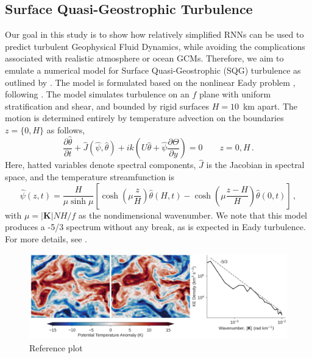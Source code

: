 \subsection{Surface Quasi-Geostrophic Turbulence}
\label{subsec:sqg}

Our goal in this study is to show how relatively simplified RNNs can be used to
predict turbulent Geophysical Fluid Dynamics, while avoiding the complications
associated with realistic atmosphere or ocean GCMs.
Therefore, we aim to emulate a numerical model for Surface Quasi-Geostrophic
(SQG) turbulence as outlined by \citet{tulloch_note_2009}.
The model is formulated based on the nonlinear Eady problem
\citep{eady_long_1949}, following \citet{blumen_uniform_1978-1}.
The model simulates turbulence
on an $f$ plane with uniform stratification and shear, and bounded by rigid
surfaces $H=10$~km apart.
The motion is determined entirely by temperature advection on the boundaries
$z=\{0,H\}$ as follows,
\begin{equation*}
    \dfrac{\partial \hat{\theta}}{\partial t} +
    \hat{J}(\hat{\psi}, \hat{\theta}) + ik\left(U \hat{\theta} +
        \hat{\psi}\dfrac{\partial \Theta}{\partial y}\right)
    = 0 \qquad z = 0, H \, .
\end{equation*}
Here, hatted variables denote spectral components, $\hat{J}$ is the Jacobian in
spectral space, and the temperature streamfunction is
\begin{equation*}
    \hat{\psi}(z,t) = \dfrac{H}{\mu\sinh\mu}
    \left[ \cosh\left(\mu\dfrac{z}{H}\right) \hat{\theta}(H,t)
        - \cosh\left(\mu\dfrac{z-H}{H}\right) \hat{\theta}(0,t)
    \right]\, ,
\end{equation*}
with $\mu = |\mathbf{K}| NH/f$ as the nondimensional wavenumber.
We note that this model produces a -5/3 spectrum without any break,
as is expected in Eady turbulence.
For more details, see \citep{tulloch_note_2009}.


\begin{figure}
    \centering
    \includegraphics[width=\textwidth]{../figures/sqg_reference_plot.jpg}
    \caption{Reference plot}
    \label{fig:sqg-reference}
\end{figure}

